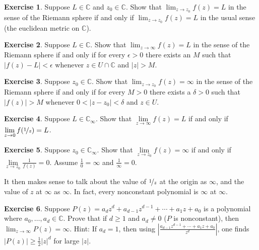 \documentclass[12pt,openany]{book}
\newcommand{\sabs}[1]{\lvert {#1} \rvert}
\newcommand{\abs}[1]{\left\lvert {#1} \right\rvert}
\newcommand{\C}{{\mathbb{C}}}
\theoremstyle{plain}
\theoremstyle{remark}
\theoremstyle{definition}
\newenvironment{exbox}{%
    \def\FrameCommand{\vrule width 1pt \relax\hspace{10pt}}%
    \MakeFramed{\advance\hsize-\width\FrameRestore}%
}{%
    \endMakeFramed
}
\theoremstyle{exercise}
\newtheorem{exercise}{Exercise}[section]
\theoremstyle{example}
\begin{document}
\begin{exbox}
\begin{exercise}%
Suppose $L \in \C$ and $z_0 \in \C$.
Show that $\lim_{z\to z_0} f(z) = L$ in the sense of the Riemann sphere
if and only if $\lim_{z \to z_0} f(z) = L$ in the usual sense (the euclidean
metric on $\C$).
\end{exercise}

\begin{exercise}%
Suppose $L \in \C$.
Show that $\lim_{z\to \infty} f(z) = L$ in the sense of the Riemann sphere
if and only if for every $\epsilon > 0$ there exists an $M$ such that
$\sabs{f(z)-L} < \epsilon$ whenever $z \in U \cap \C$ and $\sabs{z} > M$.
\end{exercise}

\begin{exercise}%
Suppose $z_0 \in \C$.
Show that $\lim_{z\to z_0} f(z) = \infty$ in the sense of the Riemann sphere
if and only if for every $M > 0$ there exists a $\delta > 0$ such that
$\sabs{f(z)} > M$ whenever $0 < \sabs{z-z_0} < \delta$ and $z \in U$.
\end{exercise}

\begin{exercise}%
Suppose $L \in \C_\infty$.
Show that $\lim\limits_{z\to\infty} f(z) = L$ if and only if
$\lim\limits_{z \to 0} f(\nicefrac{1}{z}) = L$.
\end{exercise}

\begin{exercise}%
Suppose $z_0 \in \C_\infty$.
Show that $\lim\limits_{z\to z_0} f(z) = \infty$ if and only if
$\lim\limits_{z \to z_0} \frac{1}{f(z)} = 0$.
Assume $\frac{1}{0} = \infty$ and 
$\frac{1}{\infty} = 0$.
\end{exercise}
\end{exbox}

It then makes sense to talk about the value of $\nicefrac{1}{z}$ at the origin
as $\infty$, and the value of $z$ at $\infty$ as $\infty$.
In fact, every nonconstant polynomial is $\infty$ at $\infty$.

\begin{exbox}
\begin{exercise}%
\label{exercise:polygoesinf}
Suppose $P(z) = a_d z^d + a_{d-1} z^{d-1} + \cdots + a_1 z + a_0$ is
a polynomial where $a_0,\ldots,a_d \in \C$.  Prove that if $d \geq 1$
and $a_d \neq 0$ ($P$ is nonconstant),
then $\lim_{z \to \infty} P(z) = \infty$.
Hint: If $a_d = 1$, then using
$\abs{\frac{a_{d-1} z^{d-1} + \cdots + a_1 z + a_0}{z^d}}$, one finds
$\abs{P(z)} \geq \frac{1}{2} \sabs{z}^d$ for large $\sabs{z}$.
\end{exercise}
\end{exbox}
\end{document}
